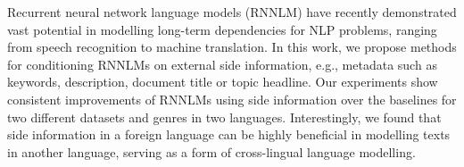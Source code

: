 Recurrent neural network language models (RNNLM) have recently demonstrated vast potential in modelling long-term dependencies for NLP problems, ranging from speech recognition to machine translation. In this work, we propose methods for conditioning RNNLMs on external side information, e.g., metadata such as keywords, description, document title or topic headline. Our experiments show consistent improvements of RNNLMs using side information over the baselines for two different datasets and genres in two languages. Interestingly, we found that side information in a foreign language can be highly beneficial in modelling texts in another language, serving as a form of cross-lingual language modelling.
